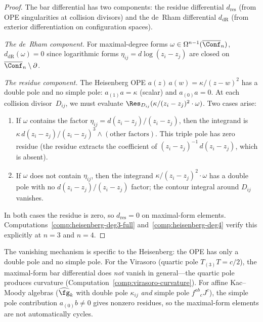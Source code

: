 \begin{proof}
The bar differential has two components: the residue differential $d_{\mathrm{res}}$
(from OPE singularities at collision divisors) and the de~Rham differential
$d_{\mathrm{dR}}$ (from exterior differentiation on configuration spaces).

\emph{The de~Rham component.}
For maximal-degree forms $\omega \in \Omega^{n-1}(\overline{\Conf}_n)$,
$d_{\mathrm{dR}}(\omega) = 0$ since logarithmic forms $\eta_{ij} = d\log(z_i - z_j)$
are closed on $\overline{\Conf}_n \setminus \partial$.

\emph{The residue component.}
The Heisenberg OPE $a(z)\,a(w) = \kappa/(z-w)^2$ has a double pole
and no simple pole: $a_{(1)}a = \kappa$ (scalar) and $a_{(0)}a = 0$.
At each collision divisor~$D_{ij}$, we must evaluate
$\Res_{D_{ij}}(\kappa/(z_i - z_j)^2 \cdot \omega)$.
Two cases arise:
\begin{enumerate}
\item If $\omega$ contains the factor $\eta_{ij} = d(z_i-z_j)/(z_i-z_j)$,
  then the integrand is $\kappa\,d(z_i-z_j)/(z_i-z_j)^3 \wedge (\text{other factors})$.
  This triple pole has zero residue (the residue extracts the coefficient
  of $(z_i-z_j)^{-1}\,d(z_i-z_j)$, which is absent).
\item If $\omega$ does not contain $\eta_{ij}$, then the integrand
  $\kappa/(z_i-z_j)^2 \cdot \omega$ has a double pole with no
  $d(z_i-z_j)/(z_i-z_j)$ factor; the contour integral around $D_{ij}$
  vanishes.
\end{enumerate}
In both cases the residue is zero, so $d_{\mathrm{res}} = 0$ on
maximal-form elements.
Computations~\ref{comp:heisenberg-deg3-full} and~\ref{comp:heisenberg-deg4}
verify this explicitly at $n = 3$ and $n = 4$.
\end{proof}

\begin{remark}\label{rem:maximal-form-mechanism}
The vanishing mechanism is specific to the Heisenberg: the OPE has
only a double pole and no simple pole.  For the Virasoro
(quartic pole $T_{(3)}T = c/2$), the maximal-form bar differential
does \emph{not} vanish in general---the quartic pole produces curvature
(Computation~\ref{comp:virasoro-curvature}).
For affine Kac--Moody algebras ($\widehat{\fg}_k$ with double pole $\kappa_{ij}$
\emph{and} simple pole $f^{ab}{}_c J^c$), the simple pole contribution
$a_{(0)}b \neq 0$ gives nonzero residues, so the maximal-form
elements are not automatically cycles.
\end{remark}



